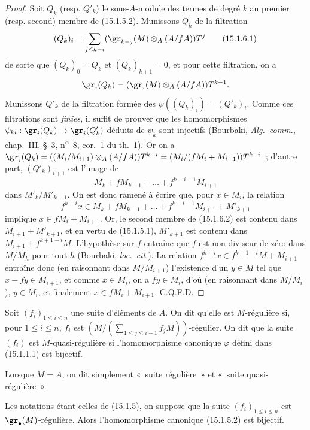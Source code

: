 \begin{proof}
Soit $Q_k$ (resp. $Q'_k$) le sous-$A$-module des termes de degré $k$ au
premier (resp. second) membre de (15.1.5.2). Munissons $Q_k$ de la filtration
\[
  (Q_k)_i=\sum_{j\leq k-i}
  (\gr_{k-j}(M)\otimes_A(A/fA))T^j
  \tag{15.1.6.1}\label{0.15.1.6.1-fr}
\]
de sorte que $(Q_k)_0=Q_k$ et $(Q_k)_{k+1}=0$, et pour cette filtration, on a
\[
  \gr_i(Q_k)=(\gr_i(M)\otimes_A(A/fA))T^{k-1}.
\]
Munissons $Q'_k$ de la filtration formée des
$\psi((Q_k)_i)=(Q'_k)_i$. Comme ces filtrations sont \emph{finies}, il suffit
de prouver que les homomorphismes
$\psi_{ki}:\gr_i(Q_k)\to\gr_i(Q'_k)$ déduits de $\psi_k$ sont injectifs
(Bourbaki, \emph{Alg.~comm.}, chap.~III, \S~3, n\textsuperscript{o}~8, cor.~1 du th.~1). Or on
a $\gr_i(Q_k)=((M_i/M_{i+1})\otimes_A(A/fA))T^{k-i}=(M_i/(fM_i+M_{i+1}))T^{k-i}$~;
d'autre part, $(Q'_k)_{i+1}$ est l'image de
\[
  M_k+fM_{k-1}+\ldots+f^{k-i-1}M_{i+1}
\]
dans $M'_k/M'_{k+1}$. On est donc ramené à écrire que, pour $x\in M_i$, la
relation
\[
  f^{k-i}x\in M_k+fM_{k-1}+\ldots+
  f^{k-i-1}M_{i+1}+M'_{k+1}
  \tag{15.1.6.2}\label{0.15.1.6.2-fr}
\]
implique $x\in fM_i+M_{i+1}$. Or, le second membre de (15.1.6.2) est contenu
dans $M_{i+1}+M'_{k+1}$, et en vertu de (15.1.5.1), $M'_{k+1}$ est contenu
dans $M_{i+1}+f^{k+1-i}M$. L'hypothèse sur $f$ entraîne que $f$ est non
diviseur de zéro dans $M/M_h$ pour tout $h$ (Bourbaki, \emph{loc.~cit.}). La
relation $f^{k-i}x\in f^{k+1-i}M+M_{i+1}$ entraîne donc (en raisonnant
dans $M/M_{i+1}$) l'existence d'un $y\in M$ tel que $x-fy\in M_{i+1}$, et comme
$x\in M_i$, on a $fy\in M_i$, d'où (en raisonnant dans $M/M_i$), $y\in M_i$,
et finalement $x\in fM_i+M_{i+1}$. C.Q.F.D.
\end{proof}

\begin{definition}[15.1.7]
\label{0.15.1.7-fr}
Soit $(f_i)_{1\leq i\leq n}$ une suite d'éléments de $A$. On dit qu'elle est
$M$-régulière si, pour $1\leq i\leq n$, $f_i$ est
$\left(M/(\sum_{1\leq j\leq i-1}f_jM)\right)$-régulier. On dit que la suite
$(f_i)$ est $M$-quasi-régulière si
l'homomorphisme canonique $\varphi$ défini dans (15.1.1.1) est bijectif.
\end{definition}

Lorsque $M=A$, on dit simplement «~suite régulière~» et
«~suite quasi-régulière~».

\begin{proposition}[15.1.8]
\label{0.15.1.8-fr}
Les notations étant celles de (15.1.5), on suppose que la suite
$(f_i)_{1\leq i\leq n}$ est $\gr_\bullet(M)$-régulière. Alors
l'homomorphisme canonique (15.1.5.2) est bijectif.
\end{proposition}

